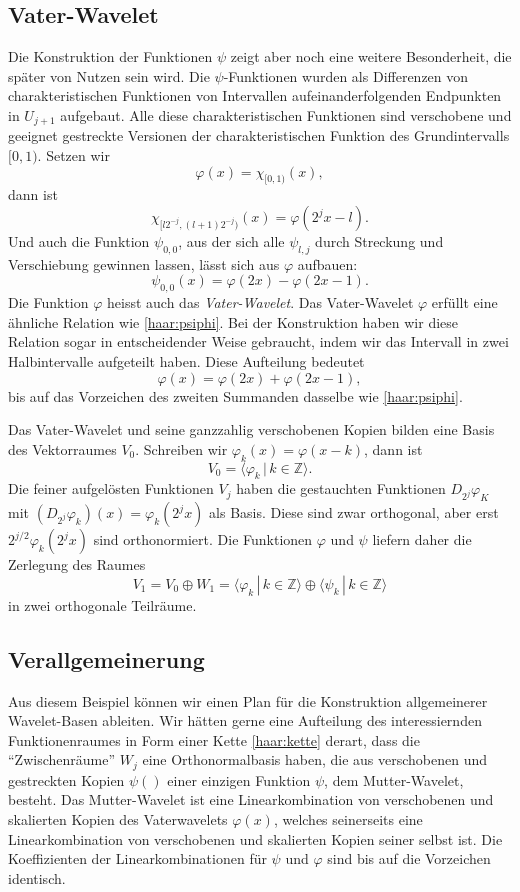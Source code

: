 \subsection{Vater-Wavelet}
Die Konstruktion der Funktionen $\psi$ zeigt aber noch eine weitere 
Besonderheit, die später von Nutzen sein wird.
Die $\psi$-Funktionen wurden als Differenzen von charakteristischen
Funktionen von Intervallen aufeinanderfolgenden Endpunkten in $U_{j+1}$
aufgebaut.
Alle diese charakteristischen Funktionen sind verschobene und geeignet
gestreckte Versionen der charakteristischen Funktion des Grundintervalls
$[0,1)$.
Setzen wir
\[
\varphi(x) = \chi_{[0,1)} (x),
\]
dann ist
\[
\chi_{[l2^{-j},(l+1)2^{-j})}(x)
=
\varphi(2^jx-l).
\]
Und auch die Funktion $\psi_{0,0}$, aus der sich alle $\psi_{l,j}$ durch
Streckung und Verschiebung gewinnen lassen, lässt sich aus $\varphi$
aufbauen:
\begin{equation}
\psi_{0,0}(x) = \varphi(2x) - \varphi(2x - 1).
\label{haar:psiphi}
\end{equation}
Die Funktion $\varphi$ heisst auch das {\em Vater-Wavelet}.
Das Vater-Wavelet $\varphi$ erfüllt eine ähnliche Relation
wie \eqref{haar:psiphi}.
Bei der Konstruktion haben wir diese Relation sogar in entscheidender
Weise gebraucht, indem wir das Intervall in zwei Halbintervalle aufgeteilt
haben.
Diese Aufteilung bedeutet
\[
\varphi(x) = \varphi(2x) + \varphi(2x-1),
\]
bis auf das Vorzeichen des zweiten Summanden dasselbe wie 
\eqref{haar:psiphi}.

Das Vater-Wavelet und seine ganzzahlig verschobenen Kopien bilden
eine Basis des Vektorraumes $V_0$.
Schreiben wir $\varphi_k(x)=\varphi(x-k)$, dann ist
\[
V_0 = \langle \varphi_k\,|\, k\in\mathbb Z\rangle.
\]
Die feiner aufgelösten Funktionen $V_j$ haben die gestauchten Funktionen
$D_{2^j}\varphi_K$ mit
$(D_{2^j}\varphi_k)(x)=\varphi_k(2^jx)$ als Basis.
Diese sind zwar orthogonal, aber erst $2^{j/2}\varphi_k(2^jx)$ sind
orthonormiert.
Die Funktionen $\varphi$ und $\psi$ liefern daher die Zerlegung
des Raumes
\[
V_1
=
V_0 \oplus W_1
=
\langle \varphi_k\,|\,k\in\mathbb Z\rangle
\oplus
\langle \psi_k\,|\,k\in\mathbb Z\rangle
\]
in zwei orthogonale Teilräume.

\subsection{Verallgemeinerung}
Aus diesem Beispiel können wir einen Plan für die Konstruktion allgemeinerer
Wavelet-Basen ableiten.
Wir hätten gerne eine Aufteilung des interessiernden Funktionenraumes
in Form einer Kette \eqref{haar:kette} derart, dass die ``Zwischenräume''
$W_j$ eine Orthonormalbasis haben, die aus verschobenen und gestreckten
Kopien
$\psi()$
einer einzigen Funktion $\psi$, dem Mutter-Wavelet, besteht.
Das Mutter-Wavelet ist eine Linearkombination von verschobenen
und skalierten Kopien des Vaterwavelets $\varphi(x)$, welches seinerseits
eine Linearkombination von verschobenen und skalierten Kopien seiner
selbst ist.
Die Koeffizienten der Linearkombinationen für $\psi$ und $\varphi$ sind
bis auf die Vorzeichen identisch.




